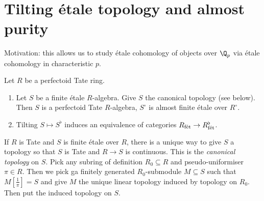 \documentclass[a4paper]{article}
\newcommand{\tilt}{\flat} %
\begin{document}
\section{Tilting étale topology and almost purity}

Motivation: this allows us to study étale cohomology of objects over \(\Q_p\) via étale cohomology in characteristic \(p\).

\begin{theorem}
  Let \(R\) be a perfectoid Tate ring.
  \begin{enumerate}
  \item Let \(S\) be a finite étale \(R\)-algebra. Give \(S\) the canonical topology (see below). Then \(S\) is a perfectoid Tate \(R\)-algebra, \(S^\circ\) is almost finite étale over \(R^\circ\).
  \item Tilting \(S \mapsto S^\tilt\) induces an equivalence of categories \(R_{\textup{fét}} \to R^\tilt_{\textup{fét}}\).
  \end{enumerate}
\end{theorem}

\begin{remark}
  If \(R\) is Tate and \(S\) is finite étale over \(R\), there is a unique way to give \(S\) a topology so that \(S\) is Tate and \(R \to S\) is continuous. This is the \emph{canonical topology} on \(S\). Pick any subring of definition \(R_0 \subseteq R\) and pseudo-uniformiser \(\pi \in R\). Then we pick ga finitely generated \(R_0\)-submodule \(M \subseteq S\) such that \(M[\frac{1}{\pi}] = S\) and give \(M\) the unique linear topology induced by topology on \(R_0\). Then put the induced topology on \(S\).
\end{remark}
\end{document}
